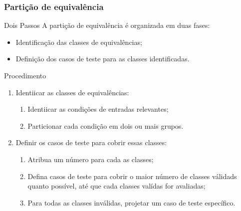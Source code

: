 \begin{frame}
\frametitle{Partição de equivalência}
\label{procedure:equivalence-partition}

\begin{block:fact}{Dois Passos}
A partição de equivalência é organizada em duas fases:
\begin{itemize}
	\item Identificação das classes de equivalências;
	\item Definição dos casos de teste para as classes identificadas.
\end{itemize}
\end{block:fact}


\begin{block:procedure}{Procedimento}
\begin{enumerate}
	\item Identiicar as classes de equivalências:
	\begin{enumerate}
		\item Identiicar as condições de entradas relevantes;
		\item Particionar cada condição em dois ou mais grupos.
	\end{enumerate}

	\item Definir os casos de teste para cobrir essas classes:
	\begin{enumerate}
		\item Atribua um número para cada as classes;
		\item Defina casos de teste para cobrir o maior número de classes válidads
		quanto possível, até que cada classes valídas for avaliadas;
		\item Para todas as classes inválidas, projetar um caso de teste específico.
	\end{enumerate}
\end{enumerate}
\end{block:procedure}

\hfill
{}
\end{frame}



